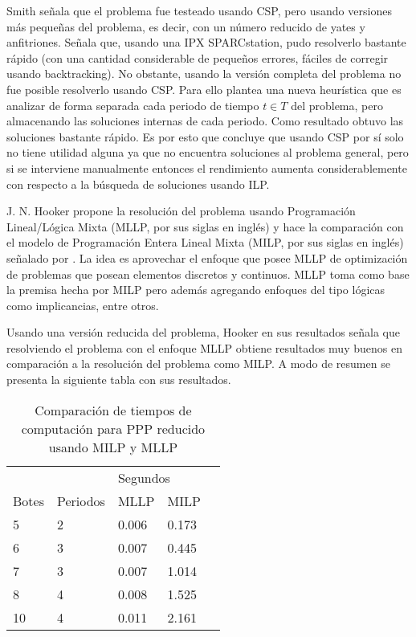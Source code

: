 \documentclass[letter, 10pt]{article}
\begin{document}
Smith\cite{Smith1996} señala que el problema fue testeado usando CSP, pero usando versiones más pequeñas del problema, es decir, con un número reducido de yates y anfitriones. Señala que, usando una IPX SPARCstation, pudo resolverlo bastante rápido (con una cantidad considerable de pequeños errores, fáciles de corregir usando backtracking). No obstante, usando la versión completa del problema no fue posible resolverlo usando CSP. Para ello plantea una nueva heurística que es analizar de forma separada cada periodo de tiempo $t\in T$ del problema, pero almacenando las soluciones internas de cada periodo. Como resultado obtuvo las soluciones bastante rápido. Es por esto que concluye que usando CSP por sí solo no tiene utilidad alguna ya que no encuentra soluciones al problema general, pero si se interviene manualmente entonces el rendimiento aumenta considerablemente con respecto a la búsqueda de soluciones usando ILP.

J. N. Hooker\cite{Hooker1999395} propone la resolución del problema usando Programación Lineal/Lógica Mixta (MLLP, por sus siglas en inglés) y hace la comparación con el modelo de Programación Entera Lineal Mixta (MILP, por sus siglas en inglés) señalado por \cite{Kalvelagen20031713}. La idea es aprovechar el enfoque que posee MLLP de optimización de problemas que posean elementos discretos y continuos. MLLP toma como base la premisa hecha por MILP pero además agregando enfoques del tipo lógicas como implicancias, entre otros.

Usando una versión reducida del problema, Hooker en sus resultados señala que resolviendo el problema con el enfoque MLLP obtiene resultados muy buenos en comparación a la resolución del problema como MILP. A modo de resumen se presenta la siguiente tabla con sus resultados\cite{Hooker1999395}.

\begin{table}[H]
\centering
\begin{tabular}{|l|l|l|l|l}
\cline{1-4}
\multicolumn{2}{|l|}{}        & \multicolumn{2}{l|}{Segundos}  &  \\ \cline{1-4}
Botes         & Periodos      & MLLP    & MILP                 &  \\ \cline{1-4}
5             & 2             & 0.006   & 0.173                &  \\ \cline{1-4}
6 & 3 & 0.007 & 0.445 &  \\ \cline{1-4}
7             & 3             & 0.007   & 1.014                &  \\ \cline{1-4}
8             & 4             & 0.008   & 1.525                &  \\ \cline{1-4}
10            & 4             & 0.011   & 2.161                &  \\ \cline{1-4}
\end{tabular}
\caption{Comparación de tiempos de computación para PPP reducido usando MILP y MLLP}
\end{table}
\end{document}
